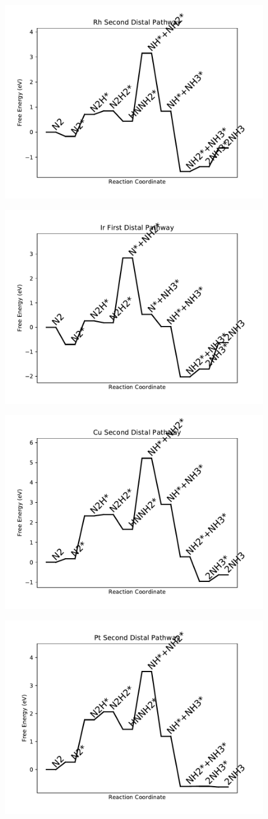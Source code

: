 \begin{figure}
\includegraphics[width=0.5\linewidth]{data/plots/Rh_distal_2.pdf}
\label{fig:Rh_distal_2}
\end{figure}

\begin{figure}
\includegraphics[width=0.5\linewidth]{data/plots/Ir_distal_1.pdf}
\label{fig:Ir_distal_1}
\end{figure}

\begin{figure}
\includegraphics[width=0.5\linewidth]{data/plots/Cu_distal_2.pdf}
\label{fig:Cu_distal_2}
\end{figure}

\begin{figure}
\includegraphics[width=0.5\linewidth]{data/plots/Pt_distal_2.pdf}
\label{fig:Pt_distal_2}
\end{figure}

